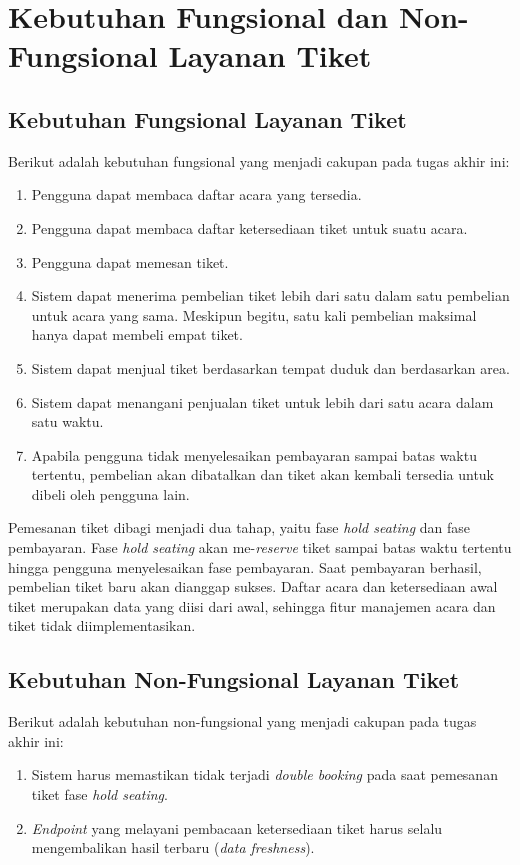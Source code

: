 \section{Kebutuhan Fungsional dan Non-Fungsional Layanan Tiket}

\subsection{Kebutuhan Fungsional Layanan Tiket}

Berikut adalah kebutuhan fungsional yang menjadi cakupan pada tugas akhir ini:

\begin{enumerate}
    \item Pengguna dapat membaca daftar acara yang tersedia.
    \item Pengguna dapat membaca daftar ketersediaan tiket untuk suatu acara.
    \item Pengguna dapat memesan tiket.
    \item Sistem dapat menerima pembelian tiket lebih dari satu dalam satu pembelian untuk acara yang sama. Meskipun begitu, satu kali pembelian maksimal hanya dapat membeli empat tiket.
    \item Sistem dapat menjual tiket berdasarkan tempat duduk dan berdasarkan area.
    \item Sistem dapat menangani penjualan tiket untuk lebih dari satu acara dalam satu waktu.
    \item Apabila pengguna tidak menyelesaikan pembayaran sampai batas waktu tertentu, pembelian akan dibatalkan dan tiket akan kembali tersedia untuk dibeli oleh pengguna lain.
\end{enumerate}

Pemesanan tiket dibagi menjadi dua tahap, yaitu fase \textit{hold seating} dan fase pembayaran. Fase \textit{hold seating} akan me-\textit{reserve} tiket sampai batas waktu tertentu hingga pengguna menyelesaikan fase pembayaran. Saat pembayaran berhasil, pembelian tiket baru akan dianggap sukses. Daftar acara dan ketersediaan awal tiket merupakan data yang diisi dari awal, sehingga fitur manajemen acara dan tiket tidak diimplementasikan.

\subsection{Kebutuhan Non-Fungsional Layanan Tiket}

Berikut adalah kebutuhan non-fungsional yang menjadi cakupan pada tugas akhir ini:

\begin{enumerate}
    \item Sistem harus memastikan tidak terjadi \textit{double booking} pada saat pemesanan tiket fase \textit{hold seating}.
    \item \textit{Endpoint} yang melayani pembacaan ketersediaan tiket harus selalu mengembalikan hasil terbaru (\textit{data freshness}).
\end{enumerate}